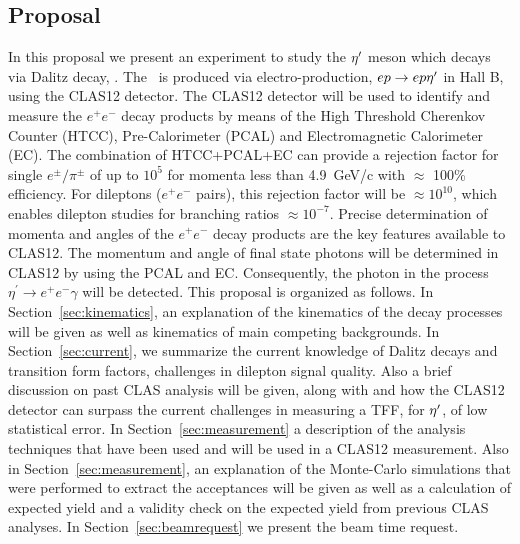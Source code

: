 \subsection{Proposal}
\indent In this proposal we present an experiment to study the $\eta^{\prime}$ meson which decays via Dalitz decay, \etaPDal. The \etaTP \ is produced via electro-production, $ep \rightarrow ep\eta^{\prime}$ in Hall B, using the CLAS12 detector. 
The CLAS12 detector will be used to identify and measure the $e^+e^-$ decay products by means of the High Threshold Cherenkov Counter (HTCC), Pre-Calorimeter (PCAL) and Electromagnetic Calorimeter (EC). The combination of HTCC+PCAL+EC can provide a rejection factor for single $e^\pm/\pi^\pm$ of up to $10^5$ for momenta less than 4.9~GeV/c with $\approx$ 100\% efficiency. For dileptons ($e^+e^-$ pairs), this rejection factor will be $\approx 10^{10}$, which enables dilepton studies for branching ratios $\approx 10^{-7}$. Precise determination of momenta and angles of the $e^+e^-$ decay products are the key features available to CLAS12. The momentum and angle of final state photons will be determined in CLAS12 by using the PCAL and EC. Consequently, the photon in the process $\eta^{\prime} \rightarrow e^+e^- \gamma$ will be detected. 
This proposal is organized as follows. In Section~\ref{sec:kinematics}, an explanation of the kinematics of the decay processes will be given as well as kinematics of main competing backgrounds. In Section~\ref{sec:current}, we summarize the current knowledge of Dalitz decays and transition form factors, challenges in dilepton signal quality. Also a brief discussion on past CLAS analysis will be given, along with and how the CLAS12 detector can surpass the current challenges in measuring a TFF, for $\eta^{\prime}$, of low statistical error. In Section~\ref{sec:measurement} a description of the analysis techniques that have been used and will be used in a CLAS12 measurement. Also in Section~\ref{sec:measurement}, an explanation of the Monte-Carlo simulations that were performed to extract the acceptances will be given as well as a calculation of expected yield and a validity check on the expected yield from previous CLAS analyses. In Section~\ref{sec:beamrequest} we present the beam time request.




